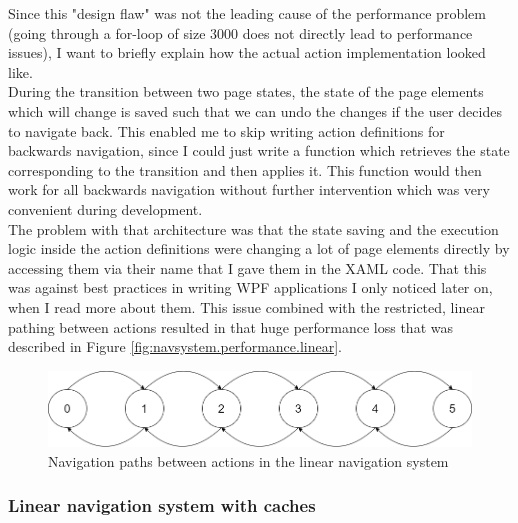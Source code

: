 Since this "design flaw" was not the leading cause of the performance problem (going through a for-loop of size 3000 does not directly lead to performance issues), I want to briefly explain how the actual action implementation looked like.\\
During the transition between two page states, the state of the page elements which will change is saved such that we can undo the changes if the user decides to navigate back. This enabled me to skip writing action definitions for backwards navigation, since I could just write a function which retrieves the state corresponding to the transition and then applies it. This function would then work for all backwards navigation without further intervention which was very convenient during development. \\
The problem with that architecture was that the state saving and the execution logic inside the action definitions were changing a lot of page elements directly by accessing them via their name that I gave them in the XAML code. That this was against best practices in writing WPF applications I only noticed later on, when I read more about them. This issue combined with the restricted, linear pathing between actions resulted in that huge performance loss that was described in Figure \ref{fig:navsystem.performance.linear}.

\begin{figure}
\centering
\includegraphics[width=\textwidth]{figures/navigationsystem-diagram/navigationsystem-linear-overview.png}
\caption[Navigation paths in linear navigation system]{Navigation paths between actions in the linear navigation system}
\label{fig:navsystem.linear.overview}
\end{figure}

\subsubsection{Linear navigation system with caches}

